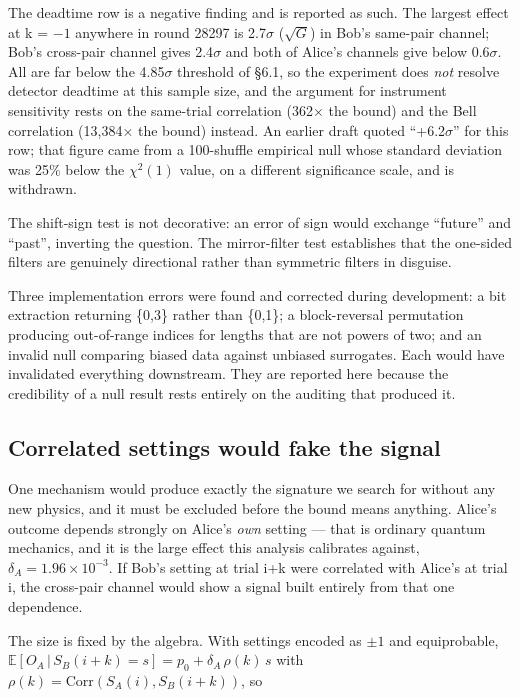 \documentclass[
  11pt,
]{article}
\begin{document}
The deadtime row is a negative finding and is reported as such. The
largest effect at k = \(-1\) anywhere in round 28297 is 2.7\(\sigma\)
(\(\sqrt{G}\)) in Bob's same-pair channel; Bob's cross-pair channel
gives 2.4\(\sigma\) and both of Alice's channels give below
0.6\(\sigma\). All are far below the 4.85\(\sigma\) threshold of \S6.1,
so the experiment does \emph{not} resolve detector deadtime at this
sample size, and the argument for instrument sensitivity rests on the
same-trial correlation (362\(\times\) the bound) and the Bell
correlation (13,384\(\times\) the bound) instead. An earlier draft
quoted ``+6.2\(\sigma\)'' for this row; that figure came from a
100-shuffle empirical null whose standard deviation was 25\% below the
\(\chi^2(1)\) value, on a different significance scale, and is
withdrawn.

The shift-sign test is not decorative: an error of sign would exchange
``future'' and ``past'', inverting the question. The mirror-filter test
establishes that the one-sided filters are genuinely directional rather
than symmetric filters in disguise.

Three implementation errors were found and corrected during development:
a bit extraction returning \{0,3\} rather than \{0,1\}; a block-reversal
permutation producing out-of-range indices for lengths that are not
powers of two; and an invalid null comparing biased data against
unbiased surrogates. Each would have invalidated everything downstream.
They are reported here because the credibility of a null result rests
entirely on the auditing that produced it.

\subsection{Correlated settings would fake the signal}

One mechanism would produce exactly the signature we search for without
any new physics, and it must be excluded before the bound means
anything. Alice's outcome depends strongly on Alice's \emph{own} setting
--- that is ordinary quantum mechanics, and it is the large effect this
analysis calibrates against, \(\delta_A = 1.96\times10^{-3}\). If Bob's
setting at trial i+k were correlated with Alice's at trial i, the
cross-pair channel would show a signal built entirely from that one
dependence.

The size is fixed by the algebra. With settings encoded as \(\pm 1\) and
equiprobable,
\(\mathbb{E}[O_A \,|\, S_B(i+k)=s] = p_0 + \delta_A\,\rho(k)\,s\) with
\(\rho(k) = \mathrm{Corr}(S_A(i), S_B(i+k))\), so
\end{document}
